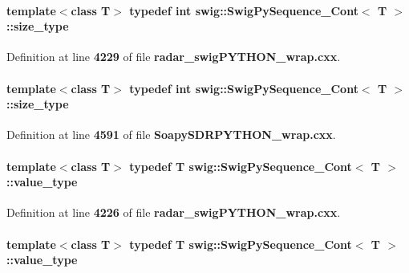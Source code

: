 \paragraph[{size\+\_\+type}]{\setlength{\rightskip}{0pt plus 5cm}template$<$class T$>$ typedef {\bf int} {\bf swig\+::\+Swig\+Py\+Sequence\+\_\+\+Cont}$<$ T $>$\+::{\bf size\+\_\+type}}\label{structswig_1_1SwigPySequence__Cont_a53e4b21ab9cdd6d0e562ef8a0923cabb}


Definition at line {\bf 4229} of file {\bf radar\+\_\+swig\+P\+Y\+T\+H\+O\+N\+\_\+wrap.\+cxx}.

\paragraph[{size\+\_\+type}]{\setlength{\rightskip}{0pt plus 5cm}template$<$class T$>$ typedef {\bf int} {\bf swig\+::\+Swig\+Py\+Sequence\+\_\+\+Cont}$<$ T $>$\+::{\bf size\+\_\+type}}\label{structswig_1_1SwigPySequence__Cont_a53e4b21ab9cdd6d0e562ef8a0923cabb}


Definition at line {\bf 4591} of file {\bf Soapy\+S\+D\+R\+P\+Y\+T\+H\+O\+N\+\_\+wrap.\+cxx}.

\paragraph[{value\+\_\+type}]{\setlength{\rightskip}{0pt plus 5cm}template$<$class T$>$ typedef T {\bf swig\+::\+Swig\+Py\+Sequence\+\_\+\+Cont}$<$ T $>$\+::{\bf value\+\_\+type}}\label{structswig_1_1SwigPySequence__Cont_adfa84ea05a454d0a9528420256ca89d9}


Definition at line {\bf 4226} of file {\bf radar\+\_\+swig\+P\+Y\+T\+H\+O\+N\+\_\+wrap.\+cxx}.

\paragraph[{value\+\_\+type}]{\setlength{\rightskip}{0pt plus 5cm}template$<$class T$>$ typedef T {\bf swig\+::\+Swig\+Py\+Sequence\+\_\+\+Cont}$<$ T $>$\+::{\bf value\+\_\+type}}\label{structswig_1_1SwigPySequence__Cont_adfa84ea05a454d0a9528420256ca89d9}


